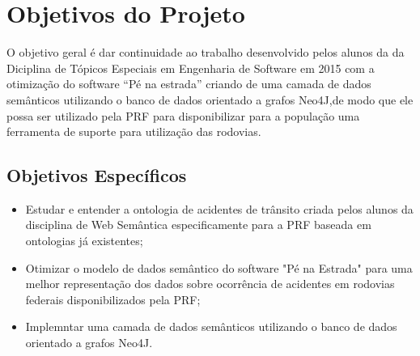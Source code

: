 \section{Objetivos do Projeto}

O objetivo geral  é dar continuidade ao trabalho desenvolvido pelos alunos da da Diciplina de Tópicos Especiais em Engenharia de Software em 2015 com a otimização do software “Pé na estrada” criando de uma camada de dados semânticos utilizando o banco de dados orientado a grafos Neo4J,de modo que ele possa ser utilizado pela PRF para disponibilizar para a população uma ferramenta de suporte para utilização das rodovias.

\subsection{Objetivos Específicos}

\begin{itemize}
 \item Estudar e entender a ontologia de acidentes de trânsito criada pelos alunos da disciplina de Web Semântica especificamente para a PRF baseada em ontologias já existentes;
  \item Otimizar o modelo de dados semântico do software "Pé na Estrada" para  uma melhor
representação dos dados sobre ocorrência de acidentes em rodovias federais
disponibilizados pela PRF;
  \item Implemntar uma camada de dados semânticos utilizando o banco de dados orientado a grafos Neo4J.
\end{itemize}
